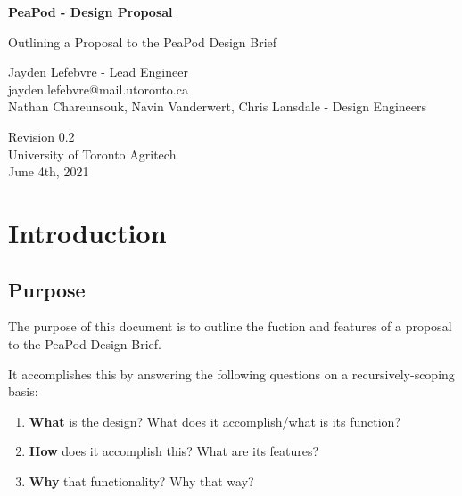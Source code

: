 \documentclass{report}
\begin{document}
\begin{titlepage}
    \begin{center}
        \vspace*{1.2cm}

        \textbf{\large{PeaPod - Design Proposal}}

        \vspace{0.5cm}

        Outlining a Proposal to the PeaPod Design Brief

        \vfill

        Jayden Lefebvre - Lead Engineer\\\small{jayden.lefebvre@mail.utoronto.ca}\\
        \vspace{1cm}
        Nathan Chareunsouk, Navin Vanderwert, Chris Lansdale - Design Engineers

        \vspace{2.5cm}

        Revision 0.2\\
        University of Toronto Agritech\\
        June 4th, 2021

    \end{center}
\end{titlepage}

\thispagestyle{plain}

\tableofcontents
\newpage

\section{Introduction}
\label{sec:intro}

\subsection{Purpose}
\label{sec:purpose}

The purpose of this document is to outline the fuction and features of a proposal to the PeaPod Design Brief.

It accomplishes this by answering the following questions on a recursively-scoping basis:
\begin{enumerate}
    \item \textbf{What} is the design? What does it accomplish/what is its function? 
    \item \textbf{How} does it accomplish this? What are its features? 
    \item \textbf{Why} that functionality? Why that way?
\end{enumerate}
\end{document}
